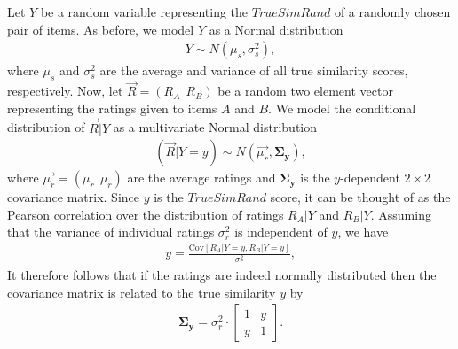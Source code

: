 \documentclass[11pt]{article}
\newcommand{\Cov}{\mathrm{Cov}}
\begin{document}
Let $Y$ be a random variable representing the $TrueSimRand$ of a randomly chosen
pair of items. As before, we model $Y$ as a Normal distribution
\begin{align}
Y \sim N(\mu_s, \sigma_s^2),
\end{align}
where $\mu_s$ and $\sigma_s^2$ are the average and variance of all true
similarity scores, respectively. Now, let $\vec{R} = \left(R_A~~R_B\right)$ be a
random two element vector representing the ratings given to items $A$ and $B$.
We model the conditional distribution of $\vec{R} | Y$ as a multivariate Normal
distribution
\begin{align}
(\vec{R} | Y=y) \sim N(\vec{\mu_r}, \mathbf{\Sigma_y}),
\end{align}
where $\vec{\mu_r} = (\mu_r~~\mu_r)$ are the average ratings and
$\mathbf{\Sigma_y}$ is the $y$-dependent $2\times2$ covariance matrix.  Since
$y$ is the $TrueSimRand$ score, it can be thought of as the Pearson correlation
over the distribution of ratings $R_A | Y$ and $R_B | Y$. Assuming that the
variance of individual ratings $\sigma_r^2$ is independent of $y$, we have 
\begin{align}
y = \frac{\Cov{\left[R_A | Y=y , R_B | Y=y\right]}}{\sigma_r^2},
\end{align}
It therefore follows that if the ratings are indeed normally distributed 
then the covariance matrix is related to the true similarity $y$ by
\begin{align}
\mathbf{\Sigma_y} = \sigma_r^2 \cdot
\left[ \begin{array}{cc}  1 & y \\ y & 1 \end{array} \right].
\end{align}
\end{document}
